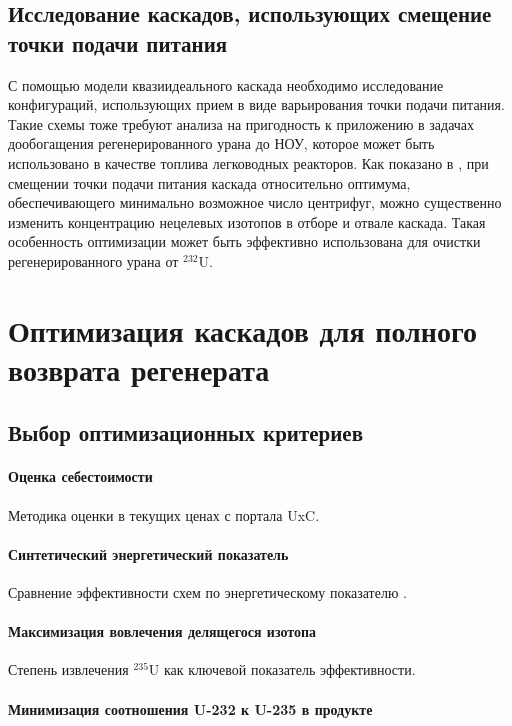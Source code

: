 \subsection{Исследование каскадов, использующих смещение точки подачи питания}\label{sec:ch2/sec1.1}
С помощью модели квазиидеального каскада необходимо исследование конфигураций, использующих прием в виде варьирования точки подачи питания. Такие схемы тоже требуют анализа на пригодность к приложению в задачах дообогащения регенерированного урана до НОУ, которое может быть использовано в качестве топлива легководных реакторов. Как показано в \cite{palk_2013}, при смещении точки подачи питания каскада относительно оптимума, обеспечивающего минимально возможное число центрифуг, можно существенно изменить концентрацию нецелевых изотопов в отборе и отвале каскада. Такая особенность оптимизации может быть эффективно использована для очистки регенерированного урана от $^{232}$U.

\section{Оптимизация каскадов для полного возврата регенерата}\label{sec:ch2/sec2}
\subsection{Выбор оптимизационных критериев}\label{sec:ch2/sec2.1}

\paragraph{Оценка себестоимости}
Методика оценки в текущих ценах с портала UxC.
\paragraph{Синтетический энергетический показатель}
Сравнение эффективности схем по энергетическому показателю \cite{2019}.
\paragraph{Максимизация вовлечения делящегося изотопа}
Степень извлечения $^{235}$U как ключевой показатель эффективности.
\paragraph{Минимизация соотношения U-232 к U-235 в продукте}

